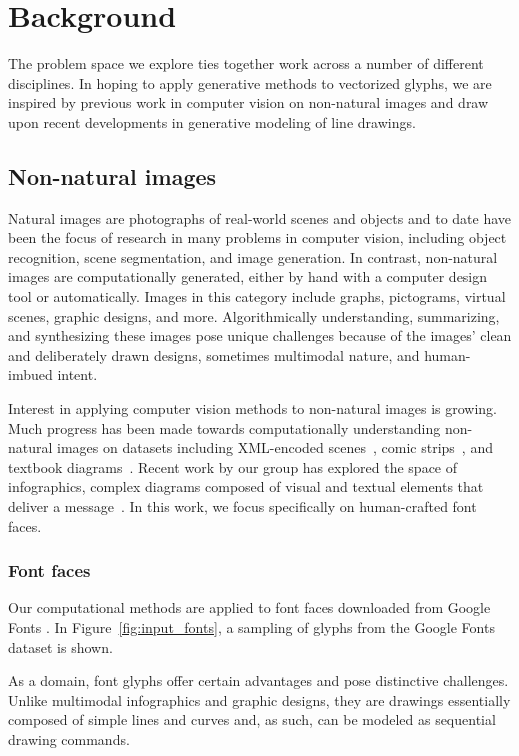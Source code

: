 \chapter{Background}
The problem space we explore ties together work across a number of different disciplines. In hoping to apply generative methods to vectorized glyphs, we are inspired by previous work in computer vision on non-natural images and draw upon recent developments in generative modeling of line drawings.

\section{Non-natural images}
Natural images are photographs of real-world scenes and objects and to date have been the focus of research in many problems in computer vision, including object recognition, scene segmentation, and image generation.
In contrast, non-natural images are computationally generated, either by hand with a computer design tool or automatically.
Images in this category include graphs, pictograms, virtual scenes, graphic designs, and more.
Algorithmically understanding, summarizing, and synthesizing these images pose unique challenges because of the images' clean and deliberately drawn designs, sometimes multimodal nature, and human-imbued intent. 

Interest in applying computer vision methods to non-natural images is growing.
Much progress has been made towards computationally understanding non-natural images on datasets including XML-encoded scenes~\cite{wu2017neural}, comic strips~\cite{iyyer2016amazing}, and textbook diagrams~\cite{seo2014diagram}.
Recent work by our group has explored the space of infographics, complex diagrams composed of visual and textual elements that deliver a message~\cite{bylinskii2017understanding}.
In this work, we focus specifically on human-crafted font faces.

\subsection{Font faces}
Our computational methods are applied to font faces downloaded from Google Fonts . In Figure~\ref{fig:input_fonts}, a sampling of glyphs from the Google Fonts dataset is shown.

As a domain, font glyphs offer certain advantages and pose distinctive challenges. Unlike multimodal infographics and graphic designs, they are drawings essentially composed of simple lines and curves and, as such, can be modeled as sequential drawing commands. 

